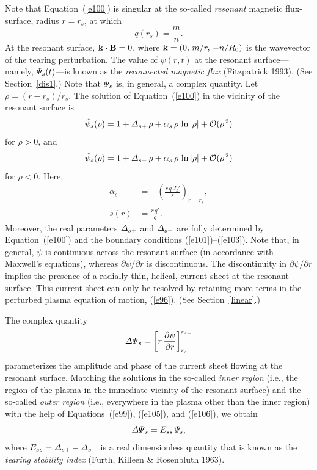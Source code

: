 \documentclass[notitlepage,12pt]{article}
\begin{document}
Note that Equation~(\ref{e100}) is singular at the so-called {\em resonant}\/ magnetic flux-surface, radius $r=r_s$, at which 
\begin{equation}\label{e104}
q(r_s)= \frac{m}{n}.
\end{equation}
At the resonant surface, ${\bf k}\cdot{\bf B}=0$, where ${\bf k} = (0,\,m/r,\,-n/R_0)$ is the wavevector of the tearing perturbation. 
The value of $\psi(r,t)$ at the resonant surface---namely, ${\mit\Psi}_s(t)$---is known as the {\em reconnected magnetic flux}\/ (Fitzpatrick 1993). (See Section~\ref{dis1}.)
Note that ${\mit\Psi}_s$ is, in general, a complex quantity. 
Let $\rho=(r-r_s)/r_s$. 
The solution of Equation~(\ref{e100}) in the vicinity of the resonant surface is
\begin{equation}\label{e105}
\hat{\psi}_s(\rho) = 1 + {\mit\Delta}_{s+}\,\rho + \alpha_s\,\rho\,\ln|\rho| + {\cal O}(\rho^{\,2})
\end{equation}
for $\rho>0$, and
\begin{equation}\label{e106}
\hat{\psi}_s(\rho) = 1 + {\mit\Delta}_{s-}\,\rho + \alpha_s\,\rho\,\ln|\rho| + {\cal O}(\rho^{\,2})
\end{equation}
for $\rho<0$. Here, 
\begin{align}\label{e108}
\alpha_s& =- \left(\frac{r\,q\,J_z'}{s}\right)_{r=r_s},\\[0.5ex]
s(r) &= \frac{r\,q'}{q}.\label{shear}
\end{align}
Moreover,  the real parameters ${\mit\Delta}_{s+}$ and  ${\mit\Delta}_{s-}$ are fully determined by Equation~(\ref{e100})
and the boundary conditions (\ref{e101})--(\ref{e103}). Note that, in general, $\psi$ is continuous across the resonant surface (in accordance with Maxwell's equations),
whereas $\partial\psi/\partial r$ is discontinuous. The discontinuity in $\partial \psi/\partial r$ implies the presence of a radially-thin, helical,  current sheet  at the resonant surface. This current sheet can only be resolved by retaining more terms in the perturbed plasma equation of motion, (\ref{e96}). (See Section~\ref{linear}.) 

The complex quantity
\begin{equation}\label{e109}
{\mit\Delta\Psi}_s = \left[r\,\frac{\partial \psi}{\partial r}\right]_{r_{s-}}^{r_{s+}}
\end{equation}
parameterizes the amplitude and phase of the current sheet flowing at the resonant surface. Matching the solutions
in the so-called {\em inner region}\/ (i.e., the region of the plasma in the immediate vicinity of the resonant surface)
and the so-called {\em outer region}\/ (i.e., everywhere in the plasma other than the inner region) with the help
of Equations~(\ref{e99}), (\ref{e105}), and (\ref{e106}), we obtain
\begin{equation}\label{e110}
{\mit\Delta\Psi}_s = E_{ss}\,{\mit\Psi}_s,
\end{equation}
where $E_{ss}= {\mit\Delta}_{s+}-{\mit\Delta}_{s-}$ is a real dimensionless quantity that is known as the {\em tearing stability index}\/ (Furth, Killeen \& Rosenbluth 1963). 
\end{document}
